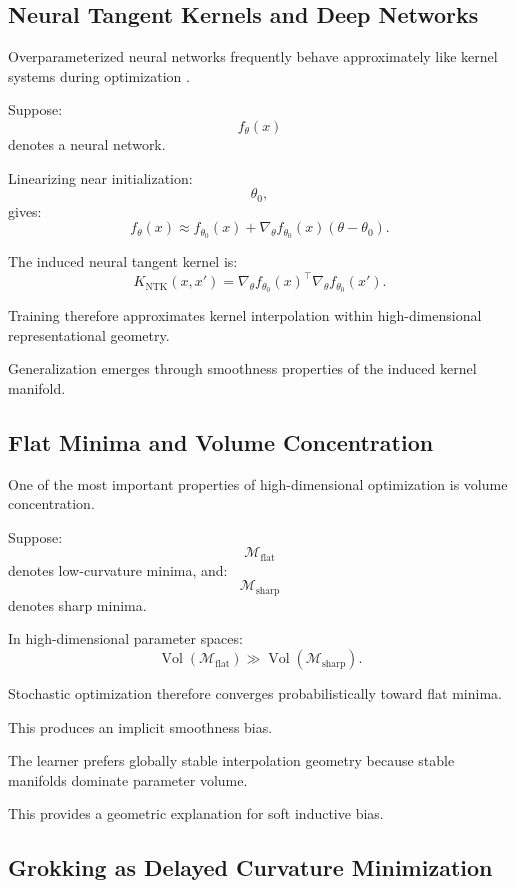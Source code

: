 \documentclass[12pt,a4paper]{article}
\begin{document}
\subsection{Neural Tangent Kernels and Deep Networks}

Overparameterized neural networks frequently behave approximately like kernel systems during optimization \cite{Jacot2018}.

Suppose:
\[
f_\theta(x)
\]
denotes a neural network.

Linearizing near initialization:
\[
\theta_0,
\]
gives:
\[
f_\theta(x)
\approx
f_{\theta_0}(x)
+
\nabla_\theta f_{\theta_0}(x)
(\theta-\theta_0).
\]

The induced neural tangent kernel is:
\[
K_{\text{NTK}}(x,x')
=
\nabla_\theta f_{\theta_0}(x)^\top
\nabla_\theta f_{\theta_0}(x').
\]

Training therefore approximates kernel interpolation within high-dimensional representational geometry.

Generalization emerges through smoothness properties of the induced kernel manifold.

\subsection{Flat Minima and Volume Concentration}

One of the most important properties of high-dimensional optimization is volume concentration.

Suppose:
\[
\mathcal{M}_{\text{flat}}
\]
denotes low-curvature minima,
and:
\[
\mathcal{M}_{\text{sharp}}
\]
denotes sharp minima.

In high-dimensional parameter spaces:
\[
\operatorname{Vol}
(
\mathcal{M}_{\text{flat}}
)
\gg
\operatorname{Vol}
(
\mathcal{M}_{\text{sharp}}
).
\]

Stochastic optimization therefore converges probabilistically toward flat minima.

This produces an implicit smoothness bias.

The learner prefers globally stable interpolation geometry because stable manifolds dominate parameter volume.

This provides a geometric explanation for soft inductive bias.

\subsection{Grokking as Delayed Curvature Minimization}
\end{document}
